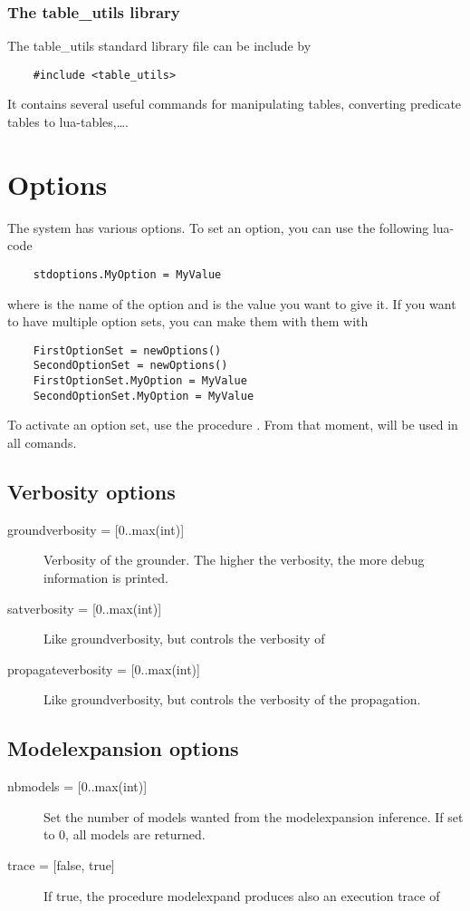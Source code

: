 \documentclass[a4]{article}
\begin{document}
\subsubsection{The table\_utils library}
The table\_utils standard library file can be include by 
\begin{lstlisting}
	#include <table_utils>
\end{lstlisting}
It contains several useful commands for manipulating tables, converting predicate tables to lua-tables,\ldots.



\section{Options}
The \idp system has various options.  To set an option, you can use the following lua-code
\begin{lstlisting}
	stdoptions.MyOption = MyValue
\end{lstlisting}
where  is the name of the option and  is the value you want to give it. If you want to have multiple option sets, you can make them with them with
\begin{lstlisting}
	FirstOptionSet = newOptions()
	SecondOptionSet = newOptions()
	FirstOptionSet.MyOption = MyValue
	SecondOptionSet.MyOption = MyValue
\end{lstlisting}
To activate an option set, use the procedure .  From that moment,  will be used in all comands.

\subsection{Verbosity options}
\begin{description}
	\item[{groundverbosity = [0..max(int)]}] Verbosity of the grounder.  The higher the verbosity, the more debug information is printed.
	\item[{satverbosity = [0..max(int)]}] Like groundverbosity, but controls the verbosity of \minisatid
	\item[{propagateverbosity = [0..max(int)]}] Like groundverbosity, but controls the verbosity of the propagation.
\end{description}

\subsection{Modelexpansion options}
\begin{description}
	\item[{nbmodels = [0..max(int)]}] Set the number of models wanted from the modelexpansion inference.  If set to 0, all models are returned.
	\item[{trace = [false, true]}] If true, the procedure modelexpand produces also an execution trace of \minisatid 
\end{description}
\end{document}
